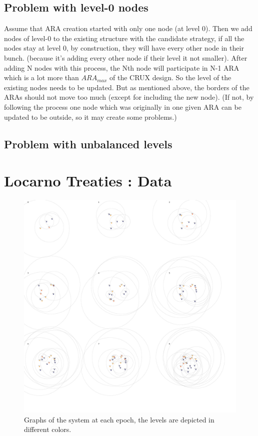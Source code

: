 \documentclass[a4paper,11pt,oneside]{report}
\begin{document}
\section{Problem with level-0 nodes} \label{app:levels-zero}
Assume that ARA creation started with only one node (at level 0). Then we add nodes of level-0 to the existing structure with the candidate strategy, if all the nodes stay at level 0, by construction, they will have every other node in their bunch. (because it’s adding every other node if their level it not smaller). After adding N nodes with this process, the Nth node will participate in N-1 ARA which is a lot more than $ARA_{max}$ of the CRUX \cite{Basescu2014} design. 
So the level of the existing nodes needs to be updated. But as mentioned above, the borders of the ARAs should not move too much (except for including the new node). (If not, by following the process one node which was originally in one given ARA can be updated to be outside, so it may create some problems.)

\section{Problem with unbalanced levels } \label{app:unbalanced-levels}

\chapter{Locarno Treaties : Data} \label{app:LocarnoTreaties-data}

\begin{figure}[!h] 
\centering
\includegraphics[width=350pt]{figures/LocarnoTreaties-RandomFinal}
\caption{Graphs of the system at each epoch, the levels are depicted in different colors.}
\label{fig:LocarnoTreaties-RandomFinal}
\end{figure}
\end{document}
